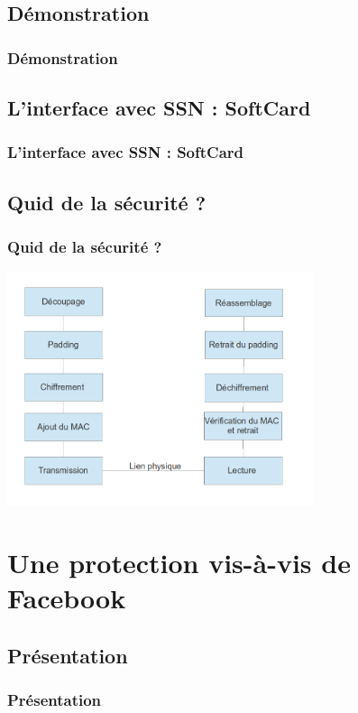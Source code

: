 \documentclass{beamer}
\begin{document}
\subsection{Démonstration}
\begin{frame}
    \frametitle{Démonstration}
    \begin{block}{}
    \end{block}
\end{frame}

\subsection{L'interface avec SSN : SoftCard}
\begin{frame}
    \frametitle{L'interface avec SSN : SoftCard}
    \begin{block}{}
    \end{block}
\end{frame}

\subsection{Quid de la sécurité ?}
\begin{frame}
    \frametitle{Quid de la sécurité ?}
\includegraphics[width=9cm]{stack}

    \begin{block}{}
    \end{block}
\end{frame}

\section{Une protection vis-à-vis de Facebook}

\subsection{Présentation}

\begin{frame}
    \frametitle{Présentation}
    \begin{block}{ }
    \end{block}
\end{frame}
\end{document}
